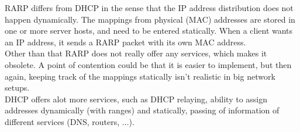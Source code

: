 RARP differs from DHCP in the sense that the IP address distribution does not happen dynamically. The mappings from physical (MAC) addresses are stored in one or more server hosts, and need to be entered statically. When a client wants an IP address, it sends a RARP packet with its own MAC address. \\
Other than that RARP does not really offer any services, which makes it obsolete. A point of contention could be that it is easier to implement, but then again, keeping track of the mappings statically isn't realistic in big network setups. \\
DHCP offers alot more services, such as DHCP relaying, ability to assign addresses dynamically (with ranges) and statically, passing of information of different services (DNS, routers, ...). 
